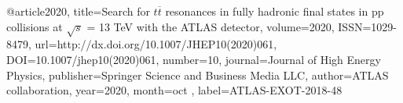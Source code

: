 @article{2020, 
    title={Search for $ t\overline{t} $ resonances in fully hadronic final states in pp collisions at $ \sqrt{s} $ = 13 TeV with the ATLAS detector}, 
    volume={2020}, 
    ISSN={1029-8479}, 
    url={http://dx.doi.org/10.1007/JHEP10(2020)061}, 
    DOI={10.1007/jhep10(2020)061}, 
    number={10}, 
    journal={Journal of High Energy Physics}, 
    publisher={Springer Science and Business Media LLC}, 
    author={ATLAS collaboration}, 
    year={2020}, 
    month=oct ,
    label={ATLAS-EXOT-2018-48}
}

